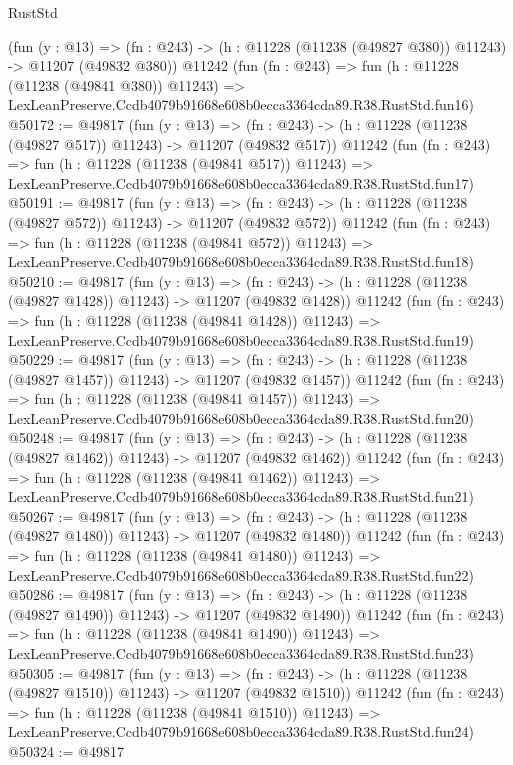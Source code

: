 \begin{lexlean}{RustStd}
\begin{coremodule}
    (fun (y : @13) =>
    (fn : @243) -> (h : @11228 (@11238 (@49827 @380)) @11243) -> @11207 (@49832 @380))
    @11242
    (fun (fn : @243) =>
    fun (h : @11228 (@11238 (@49841 @380)) @11243) =>
    LexLeanPreserve.Ccdb4079b91668e608b0ecca3364cda89.R38.RustStd.fun16)
@50172 := @49817
    (fun (y : @13) =>
    (fn : @243) -> (h : @11228 (@11238 (@49827 @517)) @11243) -> @11207 (@49832 @517))
    @11242
    (fun (fn : @243) =>
    fun (h : @11228 (@11238 (@49841 @517)) @11243) =>
    LexLeanPreserve.Ccdb4079b91668e608b0ecca3364cda89.R38.RustStd.fun17)
@50191 := @49817
    (fun (y : @13) =>
    (fn : @243) -> (h : @11228 (@11238 (@49827 @572)) @11243) -> @11207 (@49832 @572))
    @11242
    (fun (fn : @243) =>
    fun (h : @11228 (@11238 (@49841 @572)) @11243) =>
    LexLeanPreserve.Ccdb4079b91668e608b0ecca3364cda89.R38.RustStd.fun18)
@50210 := @49817
    (fun (y : @13) =>
    (fn : @243) -> (h : @11228 (@11238 (@49827 @1428)) @11243) -> @11207 (@49832 @1428))
    @11242
    (fun (fn : @243) =>
    fun (h : @11228 (@11238 (@49841 @1428)) @11243) =>
    LexLeanPreserve.Ccdb4079b91668e608b0ecca3364cda89.R38.RustStd.fun19)
@50229 := @49817
    (fun (y : @13) =>
    (fn : @243) -> (h : @11228 (@11238 (@49827 @1457)) @11243) -> @11207 (@49832 @1457))
    @11242
    (fun (fn : @243) =>
    fun (h : @11228 (@11238 (@49841 @1457)) @11243) =>
    LexLeanPreserve.Ccdb4079b91668e608b0ecca3364cda89.R38.RustStd.fun20)
@50248 := @49817
    (fun (y : @13) =>
    (fn : @243) -> (h : @11228 (@11238 (@49827 @1462)) @11243) -> @11207 (@49832 @1462))
    @11242
    (fun (fn : @243) =>
    fun (h : @11228 (@11238 (@49841 @1462)) @11243) =>
    LexLeanPreserve.Ccdb4079b91668e608b0ecca3364cda89.R38.RustStd.fun21)
@50267 := @49817
    (fun (y : @13) =>
    (fn : @243) -> (h : @11228 (@11238 (@49827 @1480)) @11243) -> @11207 (@49832 @1480))
    @11242
    (fun (fn : @243) =>
    fun (h : @11228 (@11238 (@49841 @1480)) @11243) =>
    LexLeanPreserve.Ccdb4079b91668e608b0ecca3364cda89.R38.RustStd.fun22)
@50286 := @49817
    (fun (y : @13) =>
    (fn : @243) -> (h : @11228 (@11238 (@49827 @1490)) @11243) -> @11207 (@49832 @1490))
    @11242
    (fun (fn : @243) =>
    fun (h : @11228 (@11238 (@49841 @1490)) @11243) =>
    LexLeanPreserve.Ccdb4079b91668e608b0ecca3364cda89.R38.RustStd.fun23)
@50305 := @49817
    (fun (y : @13) =>
    (fn : @243) -> (h : @11228 (@11238 (@49827 @1510)) @11243) -> @11207 (@49832 @1510))
    @11242
    (fun (fn : @243) =>
    fun (h : @11228 (@11238 (@49841 @1510)) @11243) =>
    LexLeanPreserve.Ccdb4079b91668e608b0ecca3364cda89.R38.RustStd.fun24)
@50324 := @49817

\end{coremodule}
\end{lexlean}
